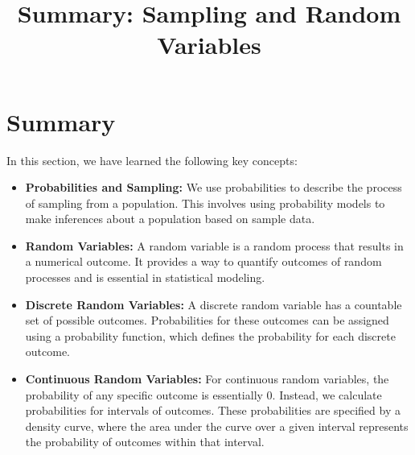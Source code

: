 \documentclass{article}
\title{Summary: Sampling and Random Variables}
\author{}
\date{}
\begin{document}
\maketitle

\section{Summary}
In this section, we have learned the following key concepts:

\begin{itemize}
    \item \textbf{Probabilities and Sampling:} We use probabilities to describe the process of sampling from a population. This involves using probability models to make inferences about a population based on sample data.
    
    \item \textbf{Random Variables:} A random variable is a random process that results in a numerical outcome. It provides a way to quantify outcomes of random processes and is essential in statistical modeling.

    \item \textbf{Discrete Random Variables:} A discrete random variable has a countable set of possible outcomes. Probabilities for these outcomes can be assigned using a probability function, which defines the probability for each discrete outcome.

    \item \textbf{Continuous Random Variables:} For continuous random variables, the probability of any specific outcome is essentially 0. Instead, we calculate probabilities for intervals of outcomes. These probabilities are specified by a density curve, where the area under the curve over a given interval represents the probability of outcomes within that interval.
\end{itemize}
\end{document}

